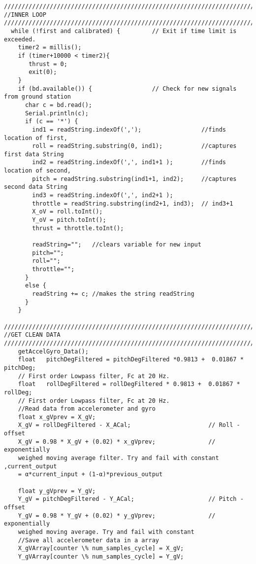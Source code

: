 \begin{lstlisting}
//////////////////////////////////////////////////////////////////////////////
//INNER LOOP
//////////////////////////////////////////////////////////////////////////////
  while (!first and calibrated) {         // Exit if time limit is exceeded.
    timer2 = millis();
    if (timer+10000 < timer2){
       thrust = 0;
       exit(0);
    }
    if (bd.available()) {                 // Check for new signals from ground station
      char c = bd.read();
      Serial.println(c);
      if (c == '*') {
        ind1 = readString.indexOf(',');                 //finds location of first,
        roll = readString.substring(0, ind1);           //captures first data String
        ind2 = readString.indexOf(',', ind1+1 );        //finds location of second,
        pitch = readString.substring(ind1+1, ind2);     //captures second data String
        ind3 = readString.indexOf(',', ind2+1 );
        throttle = readString.substring(ind2+1, ind3);  // ind3+1
        X_oV = roll.toInt();
        Y_oV = pitch.toInt();
        thrust = throttle.toInt();
       
        readString="";   //clears variable for new input
        pitch="";
        roll="";
        throttle="";
      }  
      else {    
        readString += c; //makes the string readString
      }
    }
    
//////////////////////////////////////////////////////////////////////////////
//GET CLEAN DATA
//////////////////////////////////////////////////////////////////////////////
    getAccelGyro_Data();
    float   pitchDegFiltered = pitchDegFiltered *0.9813 +  0.01867 * pitchDeg; 
    // First order Lowpass filter, Fc at 20 Hz.
    float   rollDegFiltered = rollDegFiltered * 0.9813 +  0.01867 * rollDeg;
    // First order Lowpass filter, Fc at 20 Hz.
    //Read data from accelerometer and gyro
    float x_gVprev = X_gV;
    X_gV = rollDegFiltered - X_ACal;                      // Roll - offset
    X_gV = 0.98 * X_gV + (0.02) * x_gVprev;               // exponentially 
    weighed moving average filter. Try and fail with constant ,current_output 
    = α*current_input + (1-α)*previous_output
 
    float y_gVprev = Y_gV;
    Y_gV = pitchDegFiltered - Y_ACal;                     // Pitch - offset
    Y_gV = 0.98 * Y_gV + (0.02) * y_gVprev;               // exponentially 
    weighed moving average. Try and fail with constant
    //Save all accelerometer data in a array
    X_gVArray[counter \% num_samples_cycle] = X_gV;
    Y_gVArray[counter \% num_samples_cycle] = Y_gV;
 

\end{lstlisting}

